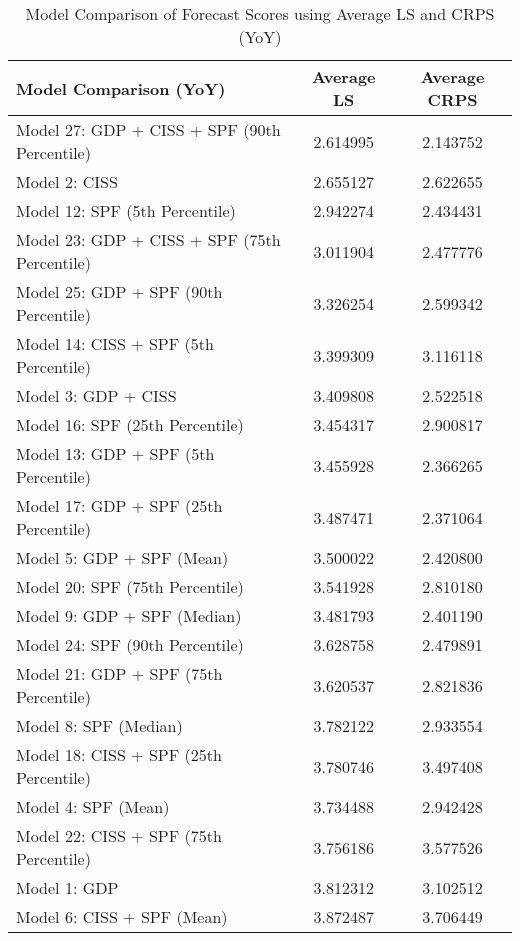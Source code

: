 \documentclass{article}
\begin{document}
\begin{table}[h!]
    \centering
    \caption{Model Comparison of Forecast Scores using Average LS and CRPS (YoY)}
    \begin{adjustbox}{width=\textwidth}
    \begin{tabular}{l S[table-format=2.6] S[table-format=2.6]}
        \toprule
        \textbf{Model Comparison (YoY)} & \textbf{Average LS} & \textbf{Average CRPS} \\
        \midrule
        Model 27: GDP + CISS + SPF (90th Percentile) & 2.614995 & 2.143752 \\
        Model 2: CISS & 2.655127 & 2.622655 \\
        Model 12: SPF (5th Percentile) & 2.942274 & 2.434431 \\
        Model 23: GDP + CISS + SPF (75th Percentile) & 3.011904 & 2.477776 \\
        Model 25: GDP + SPF (90th Percentile) & 3.326254 & 2.599342 \\
        Model 14: CISS + SPF (5th Percentile) & 3.399309 & 3.116118 \\
        Model 3: GDP + CISS & 3.409808 & 2.522518 \\
        Model 16: SPF (25th Percentile) & 3.454317 & 2.900817 \\
        Model 13: GDP + SPF (5th Percentile) & 3.455928 & 2.366265 \\
        Model 17: GDP + SPF (25th Percentile) & 3.487471 & 2.371064 \\
        Model 5: GDP + SPF (Mean) & 3.500022 & 2.420800 \\
        Model 20: SPF (75th Percentile) & 3.541928 & 2.810180 \\
        Model 9: GDP + SPF (Median) & 3.481793 & 2.401190 \\
        Model 24: SPF (90th Percentile) & 3.628758 & 2.479891 \\
        Model 21: GDP + SPF (75th Percentile) & 3.620537 & 2.821836 \\
        Model 8: SPF (Median) & 3.782122 & 2.933554 \\
        Model 18: CISS + SPF (25th Percentile) & 3.780746 & 3.497408 \\
        Model 4: SPF (Mean) & 3.734488 & 2.942428 \\
        Model 22: CISS + SPF (75th Percentile) & 3.756186 & 3.577526 \\
        Model 1: GDP & 3.812312 & 3.102512 \\
        Model 6: CISS + SPF (Mean) & 3.872487 & 3.706449 \\

\end{tabular}
\end{adjustbox}
\end{table}
\end{document}
